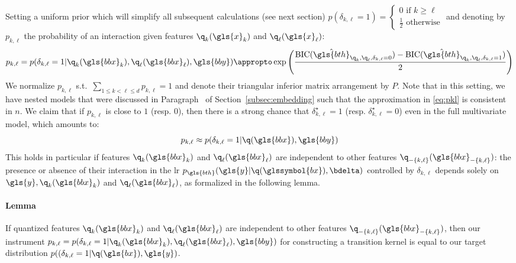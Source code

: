 Setting a uniform prior which will simplify all subsequent calculations (see next section) $p(\delta_{k,\ell}=1) =\begin{cases} 0 \text{ if } k \geq \ell \\ \frac{1}{2} \text{ otherwise} \end{cases}$ and denoting by $p_{k,\ell}$ the probability of an interaction given features $\q_k(\gls{x}_k)$ and $\q_\ell(\gls{x}_\ell)$:
\begin{equation} \label{eq:pkl}
p_{k,\ell} = p(\delta_{k,\ell} = 1 | \q_k(\gls{bbx}_k), \q_\ell(\gls{bbx}_\ell), \gls{bby}) \appropto \exp \left( \frac{\text{BIC}(\hat{\gls{bth}}_{\q_k,\q_\ell,\delta_{k,\ell}=0}) - \text{BIC}(\hat{\gls{bth}}_{\q_k,\q_\ell,\delta_{k,\ell}=1})}{2} \right)
\end{equation}
We normalize $p_{k,\ell}$ s.t.\ $\sum_{1 \leq k < \ell \leq d} p_{k,\ell} = 1$ and denote their triangular inferior matrix arrangement by $P$. Note that in this setting, we have nested models that were discussed in Paragraph~ of Section~\ref{subsec:embedding} such that the approximation in \eqref{eq:pkl} is consistent in $n$.
We claim that if $p_{k,\ell}$ is close to $1$ (resp. $0$), then there is a strong chance that $\delta_{k,\ell}^\star = 1$ (resp. $\delta_{k,\ell}^\star = 0$) even in the full multivariate model, which amounts to:
\[ p_{k,\ell} \approx p(\delta_{k,\ell} = 1 | \q(\gls{bbx}),\gls{bby}) \]
This holds in particular if features $\q_k(\gls{bbx}_k)$ and $\q_\ell(\gls{bbx}_\ell)$ are independent to other features $\q_{-\{k,\ell\}}(\gls{bbx}_{-\{k,\ell\}})$: the presence or absence of their interaction in the \gls{lr} $p_{\gls{bth}}(\gls{y} | \q(\glssymbol{bx}), \bdelta)$ controlled by $\delta_{k,\ell}$ depends solely on $\gls{y}, \q_k(\gls{bbx}_k)$ and $\q_\ell(\gls{bbx}_\ell)$, as formalized in the following lemma.

\paragraph{Lemma} If quantized features $\q_k(\gls{bbx}_k)$ and $\q_\ell(\gls{bbx}_\ell)$ are independent to other features $\q_{-\{k,\ell\}}(\gls{bbx}_{-\{k,\ell\}})$, then our instrument $p_{k,\ell} = p(\delta_{k,\ell} = 1 | \q_k(\gls{bbx}_k), \q_\ell(\gls{bbx}_\ell), \gls{bby})$ for constructing a transition kernel is equal to our target distribution $p((\delta_{k,\ell} = 1 | \q(\gls{bx}),\gls{y})$.

